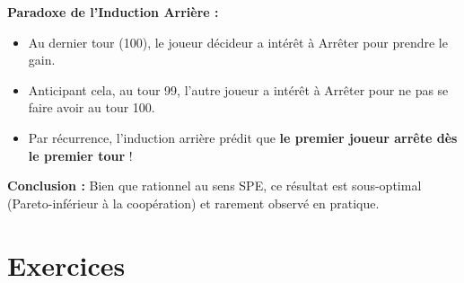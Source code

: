 \textbf{Paradoxe de l'Induction Arrière :}
\begin{itemize}
    \item Au dernier tour (100), le joueur décideur a intérêt à Arrêter pour prendre le gain.
    \item Anticipant cela, au tour 99, l'autre joueur a intérêt à Arrêter pour ne pas se faire avoir au tour 100.
    \item Par récurrence, l'induction arrière prédit que \textbf{le premier joueur arrête dès le premier tour} !
\end{itemize}
\textbf{Conclusion :} Bien que rationnel au sens SPE, ce résultat est sous-optimal (Pareto-inférieur à la coopération) et rarement observé en pratique.

\section{Exercices}
